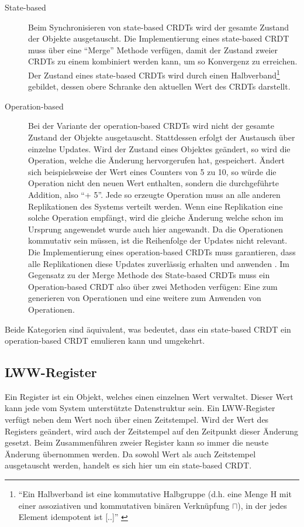 \documentclass[a4paper, 12pt]{scrreprt}
\begin{document}
\begin{description}
\label{sec:stateopbased}
	\item[State-based]
	Beim Synchronisieren von state-based CRDTs wird der gesamte Zustand der Objekte ausgetauscht. Die Implementierung eines state-based CRDT muss über eine \enquote{Merge} Methode verfügen, damit der Zustand zweier CRDTs zu einem kombiniert werden kann, um so Konvergenz zu erreichen. Der Zustand eines state-based CRDTs wird durch einen Halbverband\footnote{\enquote{Ein Halbverband ist eine kommutative Halbgruppe (d.h. eine Menge H mit einer assoziativen und kommutativen binären Verknüpfung $\sqcap$), in der jedes Element idempotent ist [..]} \autocite{MiscHalbverband}} gebildet, dessen obere Schranke den aktuellen Wert des CRDTs darstellt. \autocite{InproceedingsStateBased}
	
	\item[Operation-based]
	Bei der Variante der operation-based CRDTs wird nicht der gesamte Zustand der Objekte ausgetauscht. Stattdessen erfolgt der Austausch über einzelne Updates. Wird der Zustand eines Objektes geändert, so wird die Operation, welche die Änderung hervorgerufen hat, gespeichert. Ändert sich beispielsweise der Wert eines Counters von 5 zu 10, so würde die Operation nicht den neuen Wert enthalten, sondern die durchgeführte Addition, also \enquote{+ 5}. Jede so erzeugte Operation muss an alle anderen Replikationen des Systems verteilt werden. Wenn eine Replikation eine solche Operation empfängt, wird die gleiche Änderung welche schon im Ursprung angewendet wurde auch hier angewandt. Da die Operationen kommutativ sein müssen, ist die Reihenfolge der Updates nicht relevant. Die Implementierung eines operation-based CRDTs muss garantieren, dass alle Replikationen diese Updates zuverlässig erhalten und anwenden \autocite[S.18-19]{ArticleCRDTOverview}. Im Gegensatz zu der Merge Methode des State-based CRDTs muss ein Operation-based CRDT also über zwei Methoden verfügen: Eine zum generieren von Operationen und eine weitere zum Anwenden von Operationen.
\end{description} 

Beide Kategorien sind äquivalent\autocite[S. 9]{InproceedingsCRDTOriginal}, was bedeutet, dass ein state-based CRDT ein operation-based CRDT emulieren kann und umgekehrt.


\subsection{LWW-Register}
\sloppypar
Ein Register ist ein Objekt, welches einen einzelnen Wert verwaltet. Dieser Wert kann jede vom System unterstützte Datenstruktur sein. Ein \ac{LWW-Register} verfügt neben dem Wert noch über einen Zeitstempel. Wird der Wert des Registers geändert, wird auch der Zeitstempel auf den Zeitpunkt dieser Änderung gesetzt. Beim Zusammenführen zweier Register kann so immer die neuste Änderung übernommen werden. Da sowohl Wert als auch Zeitstempel ausgetauscht werden, handelt es sich hier um ein state-based CRDT.
\end{document}
